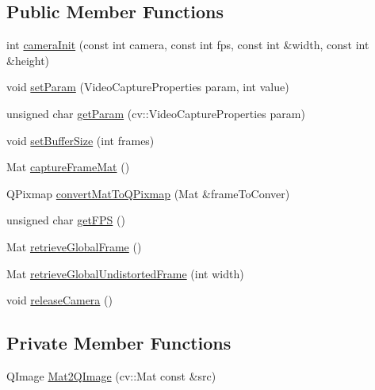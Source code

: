 \subsection*{Public Member Functions}
\begin{DoxyCompactItemize}
\item 
int \mbox{\hyperlink{class_camera_a6d17b81a1e987db60f5144d922f54e9d}{camera\+Init}} (const int camera, const int fps, const int \&width, const int \&height)
\item 
void \mbox{\hyperlink{class_camera_a9c9ba5d6bed27bdd033ea40280741cf9}{set\+Param}} (Video\+Capture\+Properties param, int value)
\item 
unsigned char \mbox{\hyperlink{class_camera_ab906269480057a5634f0760b3598e71f}{get\+Param}} (cv\+::\+Video\+Capture\+Properties param)
\item 
void \mbox{\hyperlink{class_camera_a74895f8b2414f9d5cc84682b096e0d66}{set\+Buffer\+Size}} (int frames)
\item 
Mat \mbox{\hyperlink{class_camera_abfa965e4380023e2295edd9a13f4ee63}{capture\+Frame\+Mat}} ()
\item 
Q\+Pixmap \mbox{\hyperlink{class_camera_a4d72f8dcccdb1c6bc8a4c1f36ab1553a}{convert\+Mat\+To\+Q\+Pixmap}} (Mat \&frame\+To\+Conver)
\item 
unsigned char \mbox{\hyperlink{class_camera_a4702bbf7ccf85a5a2dd61fbf6abb7237}{get\+F\+PS}} ()
\item 
Mat \mbox{\hyperlink{class_camera_a588c762e434d64ad0b515576436603cf}{retrieve\+Global\+Frame}} ()
\item 
Mat \mbox{\hyperlink{class_camera_a9b9c3210f57f3646f19e31904d5a0544}{retrieve\+Global\+Undistorted\+Frame}} (int width)
\item 
void \mbox{\hyperlink{class_camera_a08ea14c11fdb3be4a43d84db0bd1f9e5}{release\+Camera}} ()
\end{DoxyCompactItemize}
\subsection*{Private Member Functions}
\begin{DoxyCompactItemize}
\item 
Q\+Image \mbox{\hyperlink{class_camera_ae24eefae4557e25d1582f40ead4a36cb}{Mat2\+Q\+Image}} (cv\+::\+Mat const \&src)
\end{DoxyCompactItemize}
